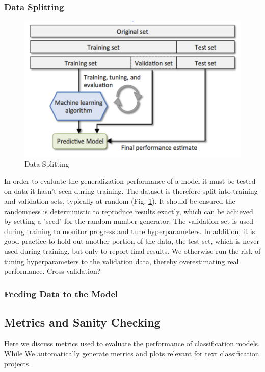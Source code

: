 \subsubsection{Data Splitting}
\begin{figure}[h]
    \includegraphics[width=\linewidth]{chapters/NLP/figures/data_splitting.png}
    \caption{Data Splitting}
    \label{fig:data_splitting}
\end{figure}
In order to evaluate the generalization performance of a model it must be tested on data it hasn't seen during training.
The dataset is therefore split into training and validation sets, typically at random (Fig. \ref{fig:data_splitting}).
It should be ensured the randomness is deterministic to reproduce results exactly, which can be achieved by setting a "seed" for the random number generator.
The validation set is used during training to monitor progress and tune hyperparameters.
In addition, it is good practice to hold out another portion of the data, the test set, which is never used during training, but only to report final results.
We otherwise run the risk of tuning hyperparameters to the validation data, thereby overestimating real performance.
Cross validation?
\subsubsection{Feeding Data to the Model}

\subsection{Metrics and Sanity Checking}
\label{metrics_and_sanity_checking}
Here we discuss metrics used to evaluate the performance of classification models.
While
We automatically generate metrics and plots relevant for text classification projects.

